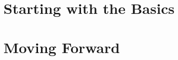 \documentclass[10pt]{book}
\begin{document}
\mainmatter

\part{Starting with the Basics}


























\part{Moving Forward}











\appendix



\printindex

\end{document}
